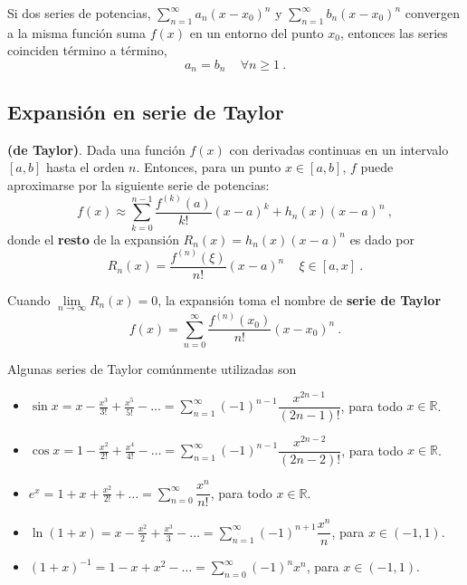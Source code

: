 \begin{teorema}
    Si dos series de potencias, $\sum\limits_{n=1}^\infty a_n(x-x_0)^n$ y $\sum\limits_{n=1}^\infty b_n(x-x_0)^n$ convergen a la misma función suma $f(x)$ en un entorno del punto $x_0$, entonces las series coinciden término a término,
    \begin{equation*}
        a_n = b_n \, \quad \forall n \geq 1 \ .
    \end{equation*}
\end{teorema}


\subsection{Expansión en serie de Taylor}

\begin{teorema}{\textbf{(de Taylor)}.}
    Dada una función $f(x)$ con derivadas continuas en un intervalo $[a, b]$ hasta el orden $n$. Entonces, para un punto $x \in [a,b]$, $f$ puede aproximarse por la siguiente serie de potencias:
    \begin{equation}
        f(x) \approx \sum_{k=0}^{n-1} \frac{f^{(k)}(a)}{k!} (x-a)^k + h_n(x) (x-a)^{n} \ ,
    \end{equation}    
    donde el \textbf{resto} de la expansión $R_n(x) = h_n(x) (x-a)^n$ es dado por
    \begin{equation}
        R_n(x) =  \frac{f^{(n)}(\xi)}{n!} (x-a)^n \, \quad \xi \in [a, x] \ .
    \end{equation}

    Cuando $\lim\limits_{n \to \infty} R_n(x) = 0$, la expansión toma el nombre de \textbf{serie de Taylor}
    \begin{equation}
        f(x) = \sum_{n=0}^{\infty} \frac{f^{(n)}(x_0)}{n!} (x-x_0)^n \ .
    \end{equation}   
\end{teorema}

\begin{ejemplo}
    Algunas series de Taylor comúnmente utilizadas son 
    \begin{itemize}
        \item $\sin x = x - \frac{x^3}{3!} + \frac{x^5}{5!} - \dots = \sum\limits_{n=1}^\infty (-1)^{n-1} \dfrac{x^{2n-1}}{(2n-1)!}$, para todo $x \in \mathbb{R}$.
        \item $\cos x = 1 - \frac{x^2}{2!} + \frac{x^4}{4!} - \dots = \sum\limits_{n=1}^\infty (-1)^{n-1} \dfrac{x^{2n-2}}{(2n-2)!}$, para todo $x \in \mathbb{R}$.
        \item $e^x = 1 + x + \frac{x^2}{2!} + \dots = \sum\limits_{n=0}^\infty \dfrac{x^n}{n!}$, para todo $x \in \mathbb{R}$.
        \item $\ln(1+x) = x - \frac{x^2}{2} + \frac{x^3}{3} - \dots = \sum\limits_{n=1}^\infty (-1)^{{n+1}} \dfrac{x^n}{n}$, para $x \in (-1,1)$.
        \item $(1+x)^{-1} = 1 - x + x^2 - \dots = \sum\limits_{n=0}^\infty (-1)^n x^n$, para $x \in (-1,1)$.
    \end{itemize}
\end{ejemplo}

